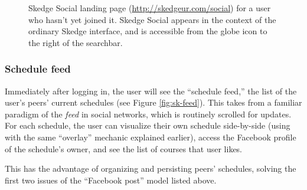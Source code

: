   \begin{figure}[H]
      \centering
      \caption[Skedge Social landing page for a user who hasn't yet joined it]{Skedge Social landing page (\url{http://skedgeur.com/social}) for a user who hasn't yet joined it. Skedge Social appears in the context of the ordinary Skedge interface, and is accessible from the globe icon to the right of the searchbar.} \label{fig:sk-social-login}
    \end{figure}

  \subsubsection{Schedule feed}

  Immediately after logging in, the user will see the ``schedule feed,'' the list of the user's peers' current schedules (see Figure \ref{fig:sk-feed}). This takes from a familiar paradigm of the \emph{feed} in social networks, which is routinely scrolled for updates. For each schedule, the user can visualize their own schedule side-by-side (using with the same ``overlay'' mechanic explained earlier), access the Facebook profile of the schedule's owner, and see the list of courses that user likes.

  This has the advantage of organizing and persisting peers' schedules, solving the first two issues of the ``Facebook post'' model listed above.
      
